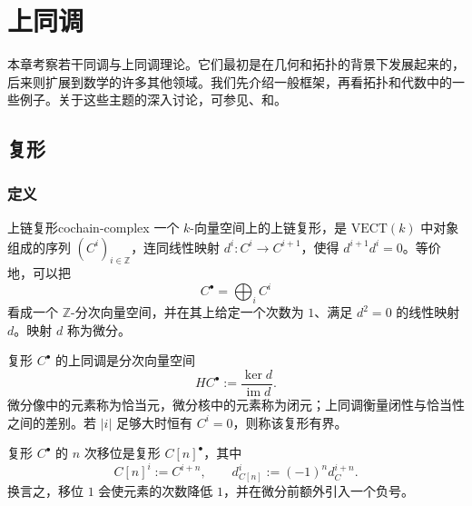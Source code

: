 \chapter{上同调}\label{ch:cohomology}
本章考察若干同调与上同调理论。它们最初是在几何和拓扑的背景下发展起来的，后来则扩展到数学的许多其他领域。我们先介绍一般框架，再看拓扑和代数中的一些例子。关于这些主题的深入讨论，可参见、和。

\section{复形}\label{sec:complexes}
\subsection{定义}\label{subsec:complex-definition}
\begin{definition}{上链复形}{cochain-complex}
一个 $k$-向量空间上的上链复形，是 $\mathrm{VECT}(k)$ 中对象组成的序列 $(C^i)_{i\in\mathbb Z}$，连同线性映射 $d^i\colon C^i\to C^{i+1}$，使得 $d^{i+1}d^i=0$。等价地，可以把
\[
  C^\bullet=\bigoplus_i C^i
\]
看成一个 $\mathbb Z$-分次向量空间，并在其上给定一个次数为 $1$、满足 $d^2=0$ 的线性映射 $d$。映射 $d$ 称为微分。

复形 $C^\bullet$ 的上同调是分次向量空间
\[
  HC^\bullet:=\frac{\ker d}{\operatorname{im}d}.
\]
微分像中的元素称为恰当元，微分核中的元素称为闭元；上同调衡量闭性与恰当性之间的差别。若 $|i|$ 足够大时恒有 $C^i=0$，则称该复形有界。

复形 $C^\bullet$ 的 $n$ 次移位是复形 $C[n]^\bullet$，其中
\[
  C[n]^i:=C^{i+n},\qquad d_{C[n]}^i:=(-1)^n d_C^{i+n}.
\]
换言之，移位 $1$ 会使元素的次数降低 $1$，并在微分前额外引入一个负号。
\end{definition}

